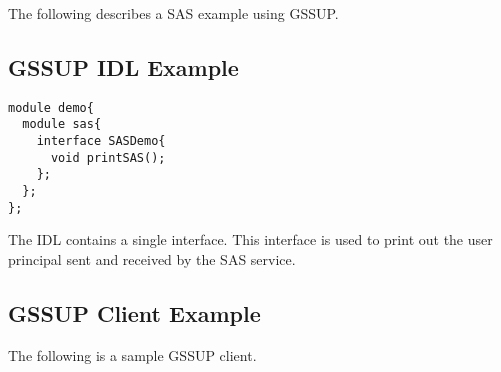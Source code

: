 The following describes a SAS example using GSSUP.

\subsection{GSSUP IDL Example}

\begin{scriptsize}
\begin{verbatim}
module demo{
  module sas{
    interface SASDemo{
      void printSAS();
    };
  };
};
\end{verbatim}
\end{scriptsize}

The IDL contains a single interface. This interface is used to print out
the user principal sent and received by the SAS service.

\subsection{GSSUP Client Example}

The following is a sample GSSUP client.

